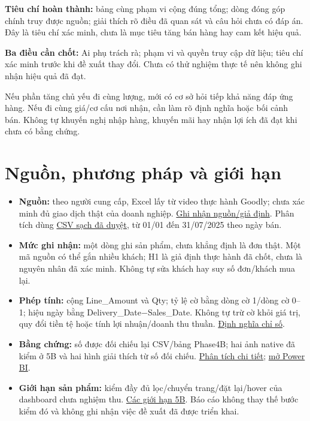\documentclass[11pt,a4paper]{article}
\newcommand{\callout}[2]{\par\smallskip\begingroup\setlength{\fboxsep}{8pt}
  \colorbox{mist}{\parbox{\dimexpr\linewidth-16pt\relax}{\textbf{#1} #2}}\endgroup\par\smallskip}
\let\originalsection\section
\renewcommand{\section}{\Needspace{5\baselineskip}\originalsection}
\begin{document}
\textbf{Tiêu chí hoàn thành:} bảng cùng phạm vi cộng đúng tổng; dòng đóng góp chính truy được nguồn; giải thích rõ điều đã quan sát và câu hỏi chưa có đáp án. Đây là tiêu chí xác minh, chưa là mục tiêu tăng bán hàng hay cam kết hiệu quả.

\callout{Ba điều cần chốt:}{Ai phụ trách rà; phạm vi và quyền truy cập dữ liệu; tiêu chí xác minh trước khi đề xuất thay đổi. Chưa có thử nghiệm thực tế nên không ghi nhận hiệu quả đã đạt.}

Nếu phần tăng chủ yếu đi cùng lượng, mới có cơ sở hỏi tiếp khả năng đáp ứng hàng. Nếu đi cùng giá/cơ cấu nơi nhận, cần làm rõ định nghĩa hoặc bối cảnh bán. Không tự khuyến nghị nhập hàng, khuyến mãi hay nhận lợi ích đã đạt khi chưa có bằng chứng.

\section{Nguồn, phương pháp và giới hạn}
\begin{itemize}
\item \textbf{Nguồn:} theo người cung cấp, Excel lấy từ video thực hành Goodly; chưa xác minh đủ giao dịch thật của doanh nghiệp. \href{run:../docs/01_data_understanding.md}{Ghi nhận nguồn/giả định}. Phân tích dùng \href{run:../data/processed/nile_sales_clean.csv}{CSV sạch đã duyệt}, từ 01/01 đến 31/07/2025 theo ngày bán.
\item \textbf{Mức ghi nhận:} một dòng ghi sản phẩm, chưa khẳng định là đơn thật. Một mã nguồn có thể gắn nhiều khách; H1 là giả định thực hành đã chốt, chưa là nguyên nhân đã xác minh. Không tự sửa khách hay suy số đơn/khách mua lại.
\item \textbf{Phép tính:} cộng Line\_Amount và Qty; tỷ lệ cờ bằng dòng cờ 1/dòng cờ 0–1; hiệu ngày bằng Delivery\_Date−Sales\_Date. Không tự trừ cờ khỏi giá trị, quy đổi tiền tệ hoặc tính lợi nhuận/doanh thu thuần. \href{run:../docs/04_measures.md}{Định nghĩa chỉ số}.
\item \textbf{Bằng chứng:} số được đối chiếu lại CSV/bảng Phase4B; hai ảnh native đã kiểm ở 5B và hai hình giải thích từ số đối chiếu. \href{run:../docs/04b_findings.md}{Phân tích chi tiết}; \href{run:../pbi/NileSales.pbip}{mở Power BI}.
\item \textbf{Giới hạn sản phẩm:} kiểm đầy đủ lọc/chuyển trang/đặt lại/hover của dashboard chưa nghiệm thu. \href{run:../docs/05b_dashboard_build.md}{Các giới hạn 5B}. Báo cáo không thay thế bước kiểm đó và không ghi nhận việc đề xuất đã được triển khai.
\end{itemize}
\end{document}
